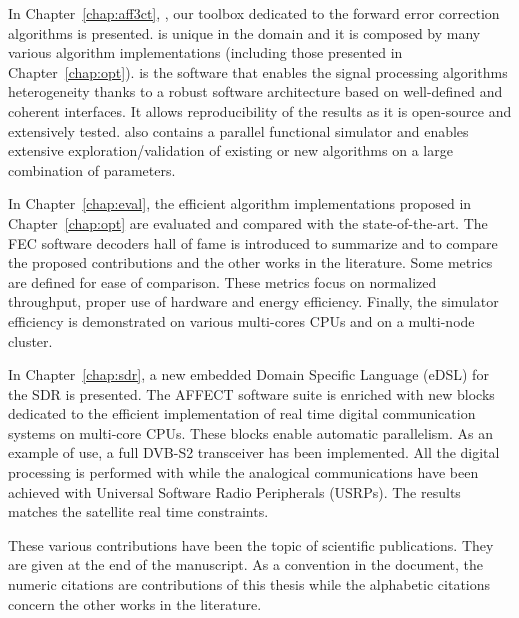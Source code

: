 In Chapter~\ref{chap:aff3ct}, \AFFECT, our toolbox dedicated to the forward
error correction algorithms is presented. \AFFECT is unique in the domain and it
is composed by many various algorithm implementations (including those presented
in Chapter~\ref{chap:opt}). \AFFECT is the software that enables the signal
processing algorithms heterogeneity thanks to a robust software architecture
based on well-defined and coherent interfaces. It allows reproducibility of the
results as it is open-source and extensively tested. \AFFECT also contains a
parallel functional simulator and enables extensive exploration/validation of
existing or new algorithms on a large combination of parameters.

In Chapter~\ref{chap:eval}, the efficient algorithm implementations proposed
in Chapter~\ref{chap:opt} are evaluated and compared with the state-of-the-art.
The FEC software decoders hall of fame is introduced to summarize and to compare
the proposed contributions and the other works in the literature. Some metrics
are defined for ease of comparison. These metrics focus on normalized
throughput, proper use of hardware and energy efficiency. Finally, the \AFFECT
simulator efficiency is demonstrated on various multi-cores CPUs and on
a multi-node cluster.

In Chapter~\ref{chap:sdr}, a new embedded Domain Specific Language (eDSL) for
the SDR is presented. The AFFECT software suite is enriched with new blocks
dedicated to the efficient implementation of real time digital communication
systems on multi-core CPUs. These blocks enable automatic parallelism. As an
example of use, a full DVB-S2 transceiver has been implemented. All the digital
processing is performed with \AFFECT while the analogical communications have
been achieved with Universal Software Radio Peripherals (USRPs). The results
matches the satellite real time constraints.

These various contributions have been the topic of scientific publications. They
are given at the end of the manuscript. As a convention in the document, the
numeric citations are contributions of this thesis while the alphabetic
citations concern the other works in the literature.


